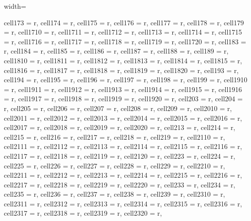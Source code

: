 \documentclass[lettersize,journal]{IEEEtran}
\begin{document}
\begin{table}
\begin{adjustbox}{width=\textwidth}
\begin{tblr}
{  cell{17}{3} = {r},  cell{17}{4} = {r},  cell{17}{5} = {r},  cell{17}{6} = {r},  cell{17}{7} = {r},  cell{17}{8} = {r},  cell{17}{9} = {r},  cell{17}{10} = {r},  cell{17}{11} = {r},  cell{17}{12} = {r},  cell{17}{13} = {r},  cell{17}{14} = {r},  cell{17}{15} = {r},  cell{17}{16} = {r},  cell{17}{17} = {r},  cell{17}{18} = {r},  cell{17}{19} = {r},  cell{17}{20} = {r},  cell{18}{3} = {r},  cell{18}{4} = {r},  cell{18}{5} = {r},  cell{18}{6} = {r},  cell{18}{7} = {r},  cell{18}{8} = {r},  cell{18}{9} = {r},  cell{18}{10} = {r},  cell{18}{11} = {r},  cell{18}{12} = {r},  
  cell{18}{13} = {r},  cell{18}{14} = {r},  cell{18}{15} = {r},  cell{18}{16} = {r},  cell{18}{17} = {r},  cell{18}{18} = {r},  cell{18}{19} = {r},  cell{18}{20} = {r},  cell{19}{3} = {r},  cell{19}{4} = {r},  cell{19}{5} = {r},  cell{19}{6} = {r},  cell{19}{7} = {r},  cell{19}{8} = {r},  cell{19}{9} = {r},  cell{19}{10} = {r},  cell{19}{11} = {r},  cell{19}{12} = {r},  cell{19}{13} = {r},  cell{19}{14} = {r},  cell{19}{15} = {r},  
  cell{19}{16} = {r},  cell{19}{17} = {r},  cell{19}{18} = {r},  cell{19}{19} = {r},  cell{19}{20} = {r},  cell{20}{3} = {r},  cell{20}{4} = {r},  cell{20}{5} = {r},  cell{20}{6} = {r},  cell{20}{7} = {r},  cell{20}{8} = {r},  cell{20}{9} = {r},  cell{20}{10} = {r},  cell{20}{11} = {r},  cell{20}{12} = {r},  cell{20}{13} = {r},  cell{20}{14} = {r},  cell{20}{15} = {r},  cell{20}{16} = {r},  cell{20}{17} = {r},  cell{20}{18} = {r},  
  cell{20}{19} = {r},  cell{20}{20} = {r},  cell{21}{3} = {r},  cell{21}{4} = {r},  cell{21}{5} = {r},  cell{21}{6} = {r},  cell{21}{7} = {r},  cell{21}{8} = {r},  cell{21}{9} = {r},  cell{21}{10} = {r},  cell{21}{11} = {r},  cell{21}{12} = {r},  cell{21}{13} = {r},  cell{21}{14} = {r},  cell{21}{15} = {r},  cell{21}{16} = {r},  cell{21}{17} = {r},  cell{21}{18} = {r},  cell{21}{19} = {r},  cell{21}{20} = {r},  cell{22}{3} = {r},  cell{22}{4} = {r},  cell{22}{5} = {r},  cell{22}{6} = {r},  cell{22}{7} = {r},  cell{22}{8} = {r},  cell{22}{9} = {r},  cell{22}{10} = {r},  
  cell{22}{11} = {r},  cell{22}{12} = {r},  cell{22}{13} = {r},  cell{22}{14} = {r},  cell{22}{15} = {r},  cell{22}{16} = {r},  cell{22}{17} = {r},  cell{22}{18} = {r},  cell{22}{19} = {r},  cell{22}{20} = {r},  cell{23}{3} = {r},  cell{23}{4} = {r},  cell{23}{5} = {r},  cell{23}{6} = {r},  cell{23}{7} = {r},  cell{23}{8} = {r},  cell{23}{9} = {r},  cell{23}{10} = {r},  cell{23}{11} = {r},  cell{23}{12} = {r},  cell{23}{13} = {r},  cell{23}{14} = {r},  cell{23}{15} = {r},  cell{23}{16} = {r},  cell{23}{17} = {r},  cell{23}{18} = {r},  cell{23}{19} = {r},  cell{23}{20} = {r},  
}
\end{tblr}
\end{adjustbox}
\end{table}
\end{document}
